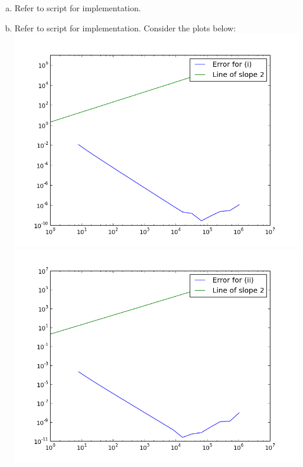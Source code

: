 \documentclass[a4paper, 12pt]{article}
\begin{document}
\begin{enumerate}[(a)]
	\item Refer to script for implementation. 
	
	\item Refer to script for implementation. Consider the plots below: \\
	\includegraphics[scale=.5]{fig3_1.png} \hfill \\
	\includegraphics[scale=.5]{fig3_2.png} \hfill \\

\end{enumerate}
\end{document}
